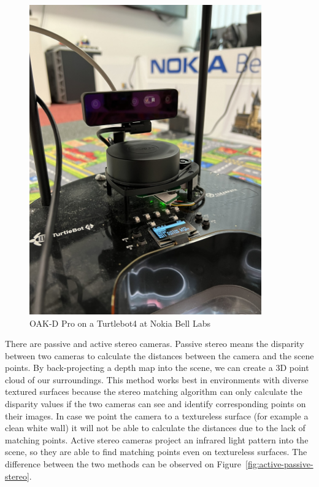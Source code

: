 \begin{figure}[htbp]
    \centering
    \includegraphics[width=100mm, keepaspectratio]{figures/oak_d_pro_nokia.JPEG}
    \caption{OAK-D Pro on a Turtlebot4 at Nokia Bell Labs}
    \label{fig:oak_d_pro_nokia}
\end{figure}

There are passive and active stereo cameras.
Passive stereo means the disparity between two cameras to calculate the distances between the camera and the scene points. By back-projecting a depth map into the scene, we can create a 3D point cloud of our surroundings. This method works best in environments with diverse textured surfaces because the stereo matching algorithm can only calculate the disparity values if the two cameras can see and identify corresponding points on their images. In case we point the camera to a textureless surface (for example a clean white wall) it will not be able to calculate the distances due to the lack of matching points. 
Active stereo cameras project an infrared light pattern into the scene, so they are able to find matching points even on textureless surfaces. The difference between the two methods can be observed on Figure~\ref{fig:active-passive-stereo}.

